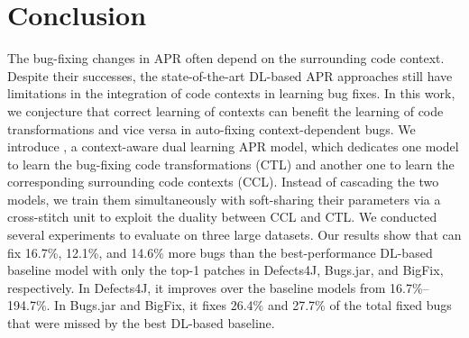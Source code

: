 \section{Conclusion}

The bug-fixing changes in APR often depend on the surrounding code
context. Despite their successes, the state-of-the-art DL-based APR
approaches still have limitations in the integration of code contexts
in learning bug fixes. In this work, we conjecture that correct
learning of contexts can benefit the learning of code transformations
and vice versa in auto-fixing context-dependent bugs. We introduce
{\tool}, a context-aware dual learning APR model, which dedicates one
model to learn the bug-fixing code transformations (CTL) and another
one to learn the corresponding surrounding code contexts
(CCL). Instead of cascading the two models, we train them
simultaneously with soft-sharing their parameters via a cross-stitch
unit to exploit the duality between CCL and CTL. We conducted several
experiments to evaluate {\tool} on three large datasets.  Our results
show that {\tool} can fix 16.7\%, 12.1\%, and 14.6\% more bugs than
the best-performance DL-based baseline model with only the top-1
patches in Defects4J, Bugs.jar, and BigFix, respectively. In
Defects4J, it improves over the baseline models from
16.7\%--194.7\%. In Bugs.jar and BigFix, it fixes 26.4\% and
27.7\% of the total fixed bugs that were missed by the best
DL-based baseline.
